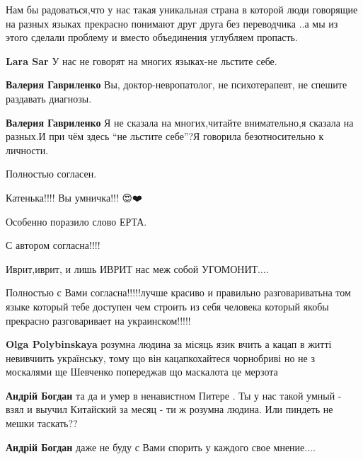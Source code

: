 \begin{itemize}
{\begin{itemize}
\end{itemize}

Нам бы радоваться,что у нас такая уникальная страна в которой люди говорящие на разных языках прекрасно понимают друг друга без переводчика ..а мы из этого сделали проблему и вместо объединения углубляем пропасть.

\begin{itemize}
\textbf{Lara Sar} У нас не говорят на многих языках-не льстите себе.

\textbf{Валерия Гавриленко} Вы, доктор-невропатолог, не психотерапевт, не спешите раздавать диагнозы.

\textbf{Валерия Гавриленко} Я не сказала на многих,читайте внимательно,я сказала на разных.И при чём здесь \enquote{не льстите себе}?Я говорила безотносительно к личности.
\end{itemize}

Полностью согласен.

Катенька!!!! Вы умничка!!! 😍❤️🌹😘😘😘

Особенно поразило слово ЕРТА.

С автором согласна!!!!

Иврит,иврит, и лишь ИВРИТ нас меж собой УГОМОНИТ....


Полностью с Вами согласна!!!!!лучше красиво и правильно разговариватьна том
языке который тебе доступен чем строить из себя человека который якобы
прекрасно разговаривает на украинском!!!!!

\begin{itemize}


\textbf{Olga Polybinskaya} розумна людина за місяць язик вчить а кацап в житті
невивчиить українську, тому що він кацап\Laughey[1.0] кохайтеся чорнобриві но не з
москалями \Laughey[1.0] ще Шевченко попереджав що маскалота це мерзота \Laughey[1.0]\Laughey[1.0]\Laughey[1.0]

\textbf{Андрій Богдан} та да и умер в ненавистном Питере \Smiley[1.0][yellow]. Ты у нас такой умный - взял и выучил Китайский за месяц - ти ж розумна людина. Или пиндеть не мешки таскать?? \Laughey[1.0]

\textbf{Андрій Богдан} даже не буду с Вами спорить у каждого свое мнение....


\end{itemize}}
\end{itemize}
